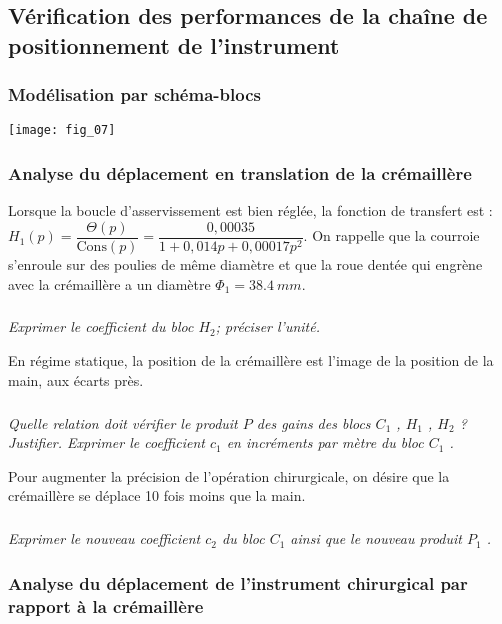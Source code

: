 \begin{multicols}{2}
\subsection*{Vérification des performances de la chaîne de positionnement de l'instrument}
\subsubsection*{Modélisation par schéma-blocs}

\begin{center}
\texttt{[image: fig\_07]}
\end{center}


\subsubsection*{Analyse du déplacement en translation de la crémaillère}
Lorsque la boucle d’asservissement est bien réglée, la fonction de transfert est : $H_1(p)=\dfrac{\Theta(p)}{\text{Cons}(p)} = \dfrac{0,00035}{1+0,014p+0,00017 p^2}$. 
On rappelle que la courroie s’enroule sur des poulies de même diamètre et que la roue dentée qui engrène avec la crémaillère a un diamètre $\Phi_1 = \SI{38,4}{mm}$.


\subparagraph{}\textit{Exprimer le coefficient du bloc $H_2$; préciser l’unité.}
\ifprof
\begin{corrige}
\end{corrige}
\else
\fi

En régime statique, la position de la crémaillère est l’image de la position de la main, aux écarts près. 

\subparagraph{}\textit{Quelle relation doit vérifier le produit $P$ des gains des blocs $C_1$ , $H_1$ , $H_2$  ? Justifier.
Exprimer le coefficient $c_1$ en incréments par mètre du bloc $C_1$ .
}
\ifprof
\begin{corrige}
\end{corrige}
\else
\fi

Pour augmenter la précision de l’opération chirurgicale, on désire que la crémaillère se déplace 10 fois moins que la main. 




\subparagraph{}\textit{Exprimer le nouveau coefficient $c_2$ du bloc $C_1$ ainsi que le nouveau produit  $P_1$ . }
\ifprof
\begin{corrige}
\end{corrige}
\else
\fi

\subsubsection*{Analyse du déplacement de l’instrument chirurgical par rapport à la crémaillère}


\end{multicols}
